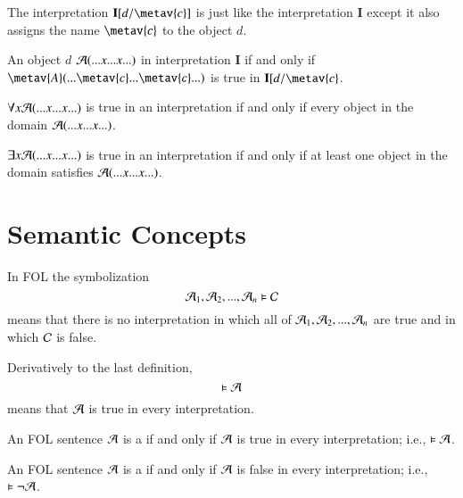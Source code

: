 \begin{definition}
    The interpretation $\mathbf{I}[d/\metav{c}]$ is just like the interpretation $\mathbf{I}$ except it also assigns the name $\metav{c}$ to the object $d$.


    An object $d$  $\mathcal{A}(...x...x...)$ in interpretation $\mathbf{I}$ if and only if $\metav{A}(...\metav{c}...\metav{c}...)$ is true in $\mathbf{I}[d/\metav{c}$.
\end{definition}

\begin{definition}
    $\forall x\mathcal{A}(...x...x...)$ is true in an interpretation if and only if every object in the domain  $\mathcal{A}(...x...x...)$.


    $\exists x \mathcal{A}(...x...x...)$ is true in an interpretation if and only if at least one object in the domain satisfies $\mathcal{A}(...x...x...)$.
\end{definition}

\section{ Semantic Concepts}

\begin{definition}
    In FOL the symbolization \begin{equation*}
        \mathcal{A}_1,\mathcal{A}_2,...,\mathcal{A}_n\vDash \mathcal{C}
    \end{equation*}
    means that there is no interpretation in which all of $\mathcal{A}_1,\mathcal{A}_2,...,\mathcal{A}_n$ are true and in which $\mathcal{C}$ is false.
\end{definition}


\begin{definition}
    Derivatively to the last definition, \begin{equation*}
        \vDash \mathcal{A}
    \end{equation*}
    means that $\mathcal{A}$ is true in every interpretation. 
\end{definition}

\begin{definition}
    An FOL sentence $\mathcal{A}$ is a  if and only if $\mathcal{A}$ is true in every interpretation; i.e., $\vDash \mathcal{A}$.
\end{definition}

\begin{definition}
    An FOL sentence $\mathcal{A}$ is a  if and only if $\mathcal{A}$ is false in every interpretation; i.e., $\vDash \neg\mathcal{A}$.
\end{definition}

